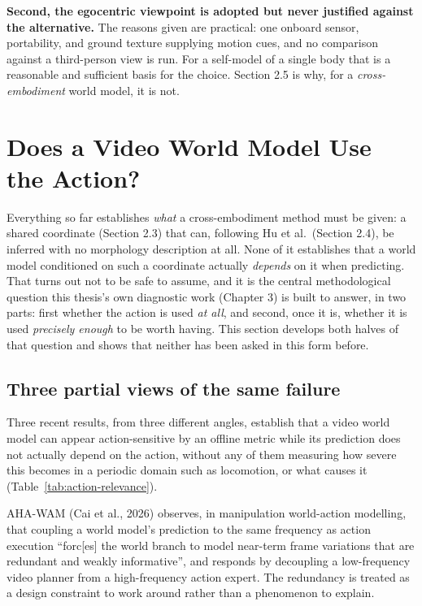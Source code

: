 \documentclass[12pt,a4paper,oneside]{report}
\begin{document}
\textbf{Second, the egocentric viewpoint is adopted but never justified against the alternative.} The
reasons given are practical: one onboard sensor, portability, and ground texture supplying motion
cues, and no comparison against a third-person view is run. For a self-model of a single body that
is a reasonable and sufficient basis for the choice. Section 2.5 is why, for a \emph{cross-embodiment}
world model, it is not.

\section{Does a Video World Model Use the Action?}
Everything so far establishes \emph{what} a cross-embodiment method must be given: a shared
coordinate (Section 2.3) that can, following Hu et al.\ (Section 2.4), be inferred with no morphology
description at all. None of it establishes that a world model conditioned on such a coordinate
actually \emph{depends} on it when predicting. That turns out not to be safe to assume, and it is the
central methodological question this thesis's own diagnostic work (Chapter 3) is built to answer, in
two parts: first whether the action is used \emph{at all}, and second, once it is, whether it is used
\emph{precisely enough} to be worth having. This section develops both halves of that question and
shows that neither has been asked in this form before.

\subsection{Three partial views of the same failure}
Three recent results, from three different angles, establish that a video world model can appear
action-sensitive by an offline metric while its prediction does not actually depend on the action,
without any of them measuring how severe this becomes in a periodic domain such as locomotion, or
what causes it (Table~\ref{tab:action-relevance}).

AHA-WAM (Cai et al., 2026) observes, in manipulation world-action modelling, that coupling a world
model's prediction to the same frequency as action execution ``forc[es] the world branch to model
near-term frame variations that are redundant and weakly informative'', and responds by decoupling a
low-frequency video planner from a high-frequency action expert. The redundancy is treated as a design
constraint to work around rather than a phenomenon to explain.
\end{document}
